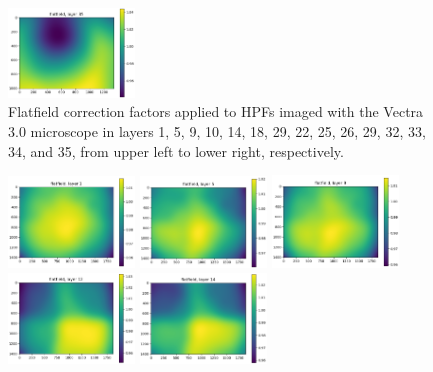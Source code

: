 \documentclass[letterpaper,11pt]{article}
\begin{document}
\begin{figure}[!ht]
\includegraphics[width=0.3\textwidth]{images/methods/flatfield_layers_vectra/flatfield_layer_35}
\caption{\footnotesize Flatfield correction factors applied to HPFs imaged with the Vectra 3.0 microscope in layers 1, 5, 9, 10, 14, 18, 29, 22, 25, 26, 29, 32, 33, 34, and 35, from upper left to lower right, respectively.}
\label{fig:applied_flatfield_layers_vectra}
\end{figure}

\begin{figure}[!ht]
\centering
\includegraphics[width=0.3\textwidth]{images/methods/flatfield_layers_polaris/flatfield_layer_1}
\includegraphics[width=0.3\textwidth]{images/methods/flatfield_layers_polaris/flatfield_layer_5}
\includegraphics[width=0.3\textwidth]{images/methods/flatfield_layers_polaris/flatfield_layer_9}
\includegraphics[width=0.3\textwidth]{images/methods/flatfield_layers_polaris/flatfield_layer_12}
\includegraphics[width=0.3\textwidth]{images/methods/flatfield_layers_polaris/flatfield_layer_14}

\end{figure}
\end{document}
